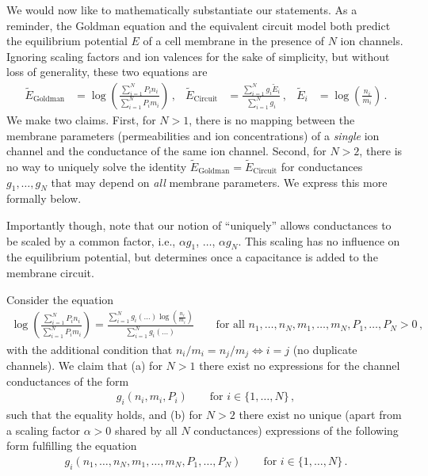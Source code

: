 We would now like to mathematically substantiate our statements.
As a reminder, the Goldman equation and the equivalent circuit model both predict the equilibrium potential $E$ of a cell membrane in the presence of $N$ ion channels.
Ignoring scaling factors and ion valences for the sake of simplicity, but without loss of generality, these two equations are
\begin{align*}
	\tilde E_\mathrm{Goldman} &= \log \left( \frac{\sum_{i=1}^N P_i n_i}{\sum_{i = 1}^N P_i m_i} \right) \,,&
	\tilde E_\mathrm{Circuit} &= \frac{\sum_{i = 1}^N g_i \tilde E_i }{\sum_{i = 1}^N g_i} \,, &
	\tilde E_i &= \log \left( \frac{n_i}{m_i} \right) \,.
\end{align*}
We make two claims. First, for $N > 1$, there is no mapping between the membrane parameters (permeabilities and ion concentrations) of a \emph{single} ion channel and the conductance of the same ion channel. Second, for $N > 2$, there is no way to uniquely solve the identity $\tilde E_\mathrm{Goldman} = \tilde E_\mathrm{Circuit}$ for conductances $g_1, \ldots, g_N$ that may depend on \emph{all} membrane parameters.
We express this more formally below.

Importantly though, note that our notion of \enquote{uniquely} allows conductances to be scaled by a common factor, i.e., $\alpha g_1$, $\ldots$, $\alpha g_N$.
This scaling has no influence on the equilibrium potential, but determines \tauMem once a capacitance is added to the membrane circuit.

\begin{claim}
Consider the equation
\begin{align*}
	 \log \left( \frac{\sum_{i=1}^N P_i n_i}{\sum_{i = 1}^N P_i m_i} \right) = \frac{\sum_{i = 1}^N g_i(\ldots)  \log \left( \frac{n_i}{m_i} \right) }{\sum_{i = 1}^N g_i(\ldots)} \quad\quad \text{for all } n_1, \ldots, n_N, m_1, \ldots, m_N, P_1, \ldots, P_N > 0 \,,
\end{align*}
with the additional condition that $n_i / m_i = n_j / m_j \Leftrightarrow i = j$ (no duplicate channels).
We claim that (a) for $N > 1$ there exist no expressions for the channel conductances of the form
\begin{align*}
	g_i(n_i, m_i, P_i) \quad\quad \text{for } i \in \{1, \ldots, N \} \,,
\end{align*}
such that the equality holds, and (b) for $N > 2$ there exist no unique (apart from a scaling factor $\alpha > 0$ shared by all $N$ conductances) expressions of the following form fulfilling the equation
\begin{align*}
	g_i(n_1, \ldots, n_N, m_1, \ldots, m_N, P_1, \ldots, P_N) \quad\quad \text{for } i \in \{1, \ldots, N \} \,.
\end{align*}
\end{claim}

